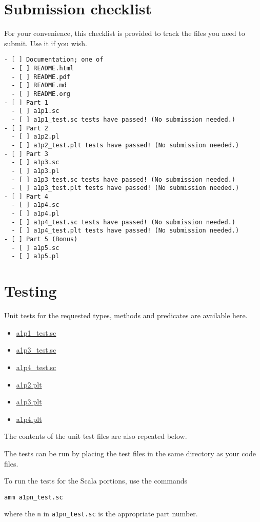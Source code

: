 \documentclass[11pt]{article}
\begin{document}
\section*{Submission checklist}
\label{sec:orgc03ae60}
For your convenience, this checklist is provided
to track the files you need to submit.
Use it if you wish.
\begin{verbatim}
- [ ] Documentation; one of
  - [ ] README.html
  - [ ] README.pdf
  - [ ] README.md
  - [ ] README.org
- [ ] Part 1
  - [ ] a1p1.sc
  - [ ] a1p1_test.sc tests have passed! (No submission needed.)
- [ ] Part 2
  - [ ] a1p2.pl
  - [ ] a1p2_test.plt tests have passed! (No submission needed.)
- [ ] Part 3
  - [ ] a1p3.sc
  - [ ] a1p3.pl
  - [ ] a1p3_test.sc tests have passed! (No submission needed.)
  - [ ] a1p3_test.plt tests have passed! (No submission needed.)
- [ ] Part 4
  - [ ] a1p4.sc
  - [ ] a1p4.pl
  - [ ] a1p4_test.sc tests have passed! (No submission needed.)
  - [ ] a1p4_test.plt tests have passed! (No submission needed.)
- [ ] Part 5 (Bonus)
  - [ ] a1p5.sc
  - [ ] a1p5.pl
\end{verbatim}

\section*{Testing}
\label{sec:orgb2ed51a}
Unit tests for the requested types, methods and predicates
are available here.
\begin{itemize}
\item \href{./testing/a1/a1p1\_test.sc}{a1p1\_test.sc}
\item \href{./testing/a1/a1p3\_test.sc}{a1p3\_test.sc}
\item \href{./testing/a1/a1p4\_test.sc}{a1p4\_test.sc}
\item \href{./testing/a1/a1p2.plt}{a1p2.plt}
\item \href{./testing/a1/a1p3.plt}{a1p3.plt}
\item \href{./testing/a1/a1p4.plt}{a1p4.plt}
\end{itemize}
The contents of the unit test files are also repeated below.

The tests can be run by placing the test files
in the same directory as your code files.

To run the tests for the Scala portions, use the commands
\begin{verbatim}
amm a1pn_test.sc
\end{verbatim}
where the \texttt{n} in \texttt{a1pn\_test.sc} is the appropriate part number.
\end{document}
